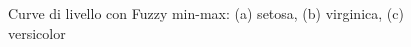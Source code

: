 \documentclass[11pt,  oneside, openany]{book}
\begin{document}
\begin{figure}[h!]
		\centering
		\quad
		 \quad
		 \quad
		\caption{Curve di livello con Fuzzy min-max: (a) setosa, (b) virginica, (c) versicolor}
		\label{curvegfmm}
	\end{figure}	
\end{document}
